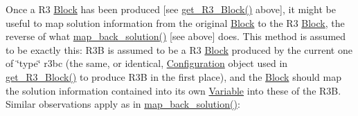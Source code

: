 Once a R3 \mbox{\hyperlink{class_s_m_spp__di__unipi__it_1_1_block}{Block}} has been produced \mbox{[}see \mbox{\hyperlink{class_s_m_spp__di__unipi__it_1_1_block_a2e682f5c0d4a74503c0cb5ab38fb6428}{get\+\_\+\+R3\+\_\+\+Block()}} above\mbox{]}, it might be useful to map solution information from the original \mbox{\hyperlink{class_s_m_spp__di__unipi__it_1_1_block}{Block}} to the R3 \mbox{\hyperlink{class_s_m_spp__di__unipi__it_1_1_block}{Block}}, the reverse of what \mbox{\hyperlink{class_s_m_spp__di__unipi__it_1_1_block_a04f0a8a608fcc3ded227c2552f67f1a3}{map\+\_\+back\+\_\+solution()}} \mbox{[}see above\mbox{]} does. This method is assumed to be exactly this\+: R3B is assumed to be a R3 \mbox{\hyperlink{class_s_m_spp__di__unipi__it_1_1_block}{Block}} produced by the current one of \char`\"{}type\char`\"{} r3bc (the same, or identical, \mbox{\hyperlink{class_s_m_spp__di__unipi__it_1_1_configuration}{Configuration}} object used in \mbox{\hyperlink{class_s_m_spp__di__unipi__it_1_1_block_a2e682f5c0d4a74503c0cb5ab38fb6428}{get\+\_\+\+R3\+\_\+\+Block()}} to produce R3B in the first place), and the \mbox{\hyperlink{class_s_m_spp__di__unipi__it_1_1_block}{Block}} should map the solution information contained into its own \mbox{\hyperlink{class_s_m_spp__di__unipi__it_1_1_variable}{Variable}} into these of the R3B. Similar observations apply as in \mbox{\hyperlink{class_s_m_spp__di__unipi__it_1_1_block_a04f0a8a608fcc3ded227c2552f67f1a3}{map\+\_\+back\+\_\+solution()}}\+:


